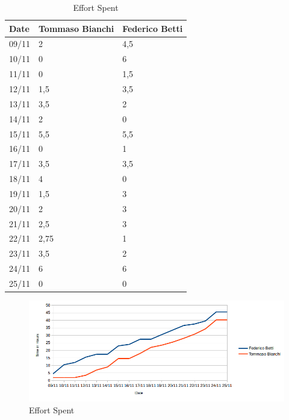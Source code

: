 \begin{table}[H]	
	\centering
	\def\arraystretch{1.25}
	\begin{tabular}{|m{5cm}|m{5cm}|m{5cm}|}
		\hline
		\textbf{Date} & \textbf{Tommaso Bianchi} &  \textbf{Federico Betti}\\ \hline
		09/11 &	2 &		4,5 \\ \hline
		10/11 &	0 &		6 \\ \hline
		11/11 &	0 &		1,5 \\ \hline
		12/11 &	1,5 &	3,5 \\ \hline
		13/11 &	3,5 &	2 \\ \hline
		14/11 &	2 &		0 \\ \hline
		15/11 &	5,5 &	5,5 \\ \hline
		16/11 &	0 &		1 \\ \hline
		17/11 &	3,5 &	3,5 \\ \hline
		18/11 &	4 &		0 \\ \hline
		19/11 &	1,5 &	3 \\ \hline
		20/11 &	2 &		3 \\ \hline
		21/11 &	2,5 &	3 \\ \hline
		22/11 &	2,75 &	1 \\ \hline
		23/11 &	3,5 &	2 \\ \hline
		24/11 &	6 &		6 \\ \hline
		25/11 &	0 &		0 \\ \hline
	\end{tabular}
	\caption{Effort Spent}
\end{table}

\begin{figure}[H]
	\centering\includegraphics[width=\textwidth]{Images/EffortSpentGraph}
	\caption{Effort Spent}
\end{figure}